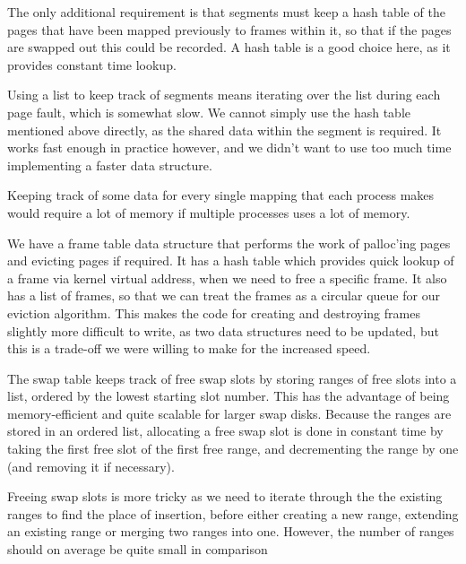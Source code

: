 The only additional requirement is that segments must keep a hash table of the
pages that have been mapped previously to frames within it, so that if the pages
are swapped out this could be recorded. A hash table is a good choice here, as
it provides constant time lookup.

Using a list to keep track of segments means iterating over the list during each
page fault, which is somewhat slow. We cannot simply use the hash table
mentioned above directly, as the shared data within the segment is required. It
works fast enough in practice however, and we didn't want to use too much time
implementing a faster data structure.

Keeping track of some data for every single mapping that each process makes would
require a lot of memory if multiple processes uses a lot of memory.

We have a frame table data structure that performs the work of palloc'ing pages
and evicting pages if required. It has a hash table which provides quick lookup
of a frame via kernel virtual address, when we need to free a specific frame. It
also has a list of frames, so that we can treat the frames as a circular queue
for our eviction algorithm. This makes the code for creating and destroying frames
slightly more difficult to write, as two data structures need to be updated, but
this is a trade-off we were willing to make for the increased speed.

The swap table keeps track of free swap slots by storing ranges of free slots into a list, ordered by the lowest starting slot number. This has the advantage of being memory-efficient and quite scalable for larger swap disks. Because the ranges are stored in an ordered list, allocating a free swap slot is done in constant time by taking the first free slot of the first free range, and decrementing the range by one (and removing it if necessary).

Freeing swap slots is more tricky as we need to iterate through the the existing ranges to find the place of insertion, before either creating a new range, extending an existing range or merging two ranges into one. However, the number of ranges should on average be quite small in comparison

